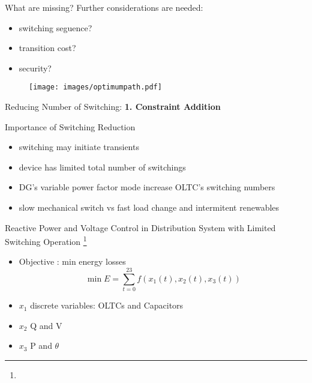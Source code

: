 \documentclass[10pt]{beamer}
\begin{document}

\begin{frame}{What are missing?}
Further considerations are needed:
\begin{itemize}
\item switching seguence?
\item transition cost?
\item security?
\end{itemize}
\begin{figure}
	\centering
		\texttt{[image: images/optimumpath.pdf]}
	\label{fig:optimumpath}
\end{figure}
\end{frame}

\begin{frame}
\begin{center}
\huge Reducing Number of Switching: \textbf{1. Constraint Addition}
\end{center}
\end{frame}

\begin{frame}{Importance of Switching Reduction}
\begin{itemize}
\item switching may initiate transients
\item device has limited  total number of switchings
\item DG's variable power factor mode increase OLTC's switching numbers
\item slow mechanical switch vs fast load change and intermitent renewables
\end{itemize}
\end{frame}


\begin{frame}{Reactive Power and Voltage Control in Distribution System with Limited Switching Operation \footnote{}}
\begin{itemize}
\item Objective : min energy losses \[  \min E = \sum_{t=0}^{23} f(x_1(t),x_2(t),x_3(t)) \]
\item $x_1$ discrete variables: OLTCs and Capacitors
\item $x_2$ Q and V
\item $x_3$ P and $\theta$
\end{itemize}
\end{frame}
\end{document}
